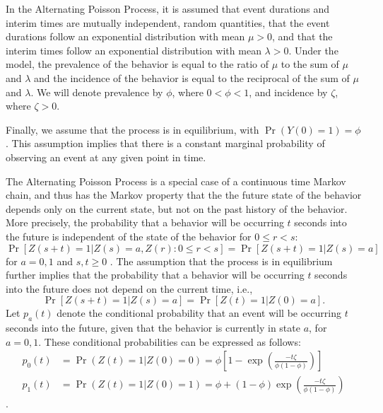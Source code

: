 \documentclass[man, noextraspace, floatsintext]{apa6}\usepackage[]{graphicx}\usepackage[]{color}
\begin{document}
In the Alternating Poisson Process, it is assumed that event durations and interim times are mutually independent, random quantities, that the event durations follow an exponential distribution with mean $\mu > 0$, and that the interim times follow an exponential distribution with mean $\lambda > 0$.  Under the model, the prevalence of the behavior is equal to the ratio of $\mu$ to the sum of $\mu$ and $\lambda$ and the incidence of the behavior is equal to the reciprocal of the sum of $\mu$ and $\lambda$. We will denote prevalence by $\phi$, where $0 < \phi < 1$, and incidence by $\zeta$, where $\zeta > 0$. 

Finally, we assume that the process is in equilibrium, with $\Pr\left(Y(0) = 1\right) = \phi$. This assumption implies that there is a constant marginal probability of observing an event at any given point in time.

The Alternating Poisson Process is a special case of a continuous time Markov chain, and thus has the Markov property that the the future state of the behavior depends only on the current state, but not on the past history of the behavior. More precisely, the probability that a behavior will be occurring $t$ seconds into the future is independent of the state of the behavior for $0 \leq r < s$: 
\begin{equation}
\label{eq:Markov}
\Pr\left[Z(s + t) = 1 \left| Z(s) = a, Z(r): 0 \leq r < s \right.\right] = \Pr\left[ Z(s + t) = 1 \left| Z(s) = a \right.\right]
\end{equation}
for $a = 0,1$ and $s,t \geq 0$ \citep[Thm. 6.1]{Kulkarni2010modeling}. The assumption that the process is in equilibrium further implies that the probability that a behavior will be occurring $t$ seconds into the future does not depend on the current time, i.e.,  
\begin{equation}
\label{eq:equilibrium}
\Pr\left[Z(s + t) = 1 \left| Z(s) = a\right.\right] = \Pr\left[ Z(t) = 1 \left| Z(0) = a \right.\right].
\end{equation}
Let $p_a(t)$ denote the conditional probability that an event will be occurring $t$ seconds into the future, given that the behavior is currently in state $a$, for $a = 0,1$. These conditional probabilities can be expressed as follows:
\begin{equation}
\begin{aligned}
p_0(t) &= \Pr(Z(t) = 1 | Z(0) = 0) = \phi \left[1 - \exp\left(\frac{- t \zeta}{\phi (1 - \phi)}\right)\right] \\
p_1(t) &= \Pr(Z(t) = 1 | Z(0) = 1) = \phi + (1 - \phi) \exp\left(\frac{- t \zeta}{\phi (1 - \phi)}\right)
\end{aligned}
\end{equation}
\citep[Eq. 6.17]{Kulkarni2010modeling}.
\end{document}
